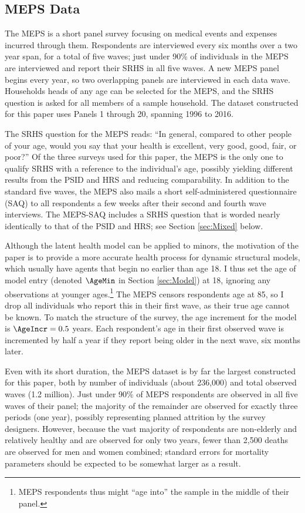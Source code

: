 \subsection{MEPS Data}\label{sec:MEPS}

The MEPS is a short panel survey focusing on medical events and expenses incurred through them.  Respondents are interviewed every six months over a two year span, for a total of five waves; just under 90\% of individuals in the MEPS are interviewed and report their SRHS in all five waves.  A new MEPS panel begins every year, so two overlapping panels are interviewed in each data wave.  Households heads of any age can be selected for the MEPS, and the SRHS question is asked for all members of a sample household.  The dataset constructed for this paper uses Panels 1 through 20, spanning 1996 to 2016.

The SRHS question for the MEPS reads: ``In general, compared to other people of your age, would you say that your health is excellent, very good, good, fair, or poor?''  Of the three surveys used for this paper, the MEPS is the only one to qualify SRHS with a reference to the individual's age, possibly yielding different results from the PSID and HRS and reducing comparability.  In addition to the standard five waves, the MEPS also mails a short self-administered questionnaire (SAQ) to all respondents a few weeks after their second and fourth wave interviews.  The MEPS-SAQ includes a SRHS question that is worded nearly identically to that of the PSID and HRS; see Section \ref{sec:Mixed} below.

Although the latent health model can be applied to minors, the motivation of the paper is to provide a more accurate health process for dynamic structural models, which usually have agents that begin no earlier than age 18.  I thus set the age of model entry (denoted $\AgeMin$ in Section \ref{sec:Model}) at 18, ignoring any observations at younger ages.\footnote{MEPS respondents thus might ``age into'' the sample in the middle of their panel.}  The MEPS censors respondents age at 85, so I drop all individuals who report this in their first wave, as their true age cannot be known.  To match the structure of the survey, the age increment for the model is $\AgeIncr=0.5$ years.  Each respondent's age in their first observed wave is incremented by half a year if they report being older in the next wave, six months later.

Even with its short duration, the MEPS dataset is by far the largest constructed for this paper, both by number of individuals (about 236,000) and total observed waves (1.2 million).  Just under 90\% of MEPS respondents are observed in all five waves of their panel; the majority of the remainder are observed for exactly three periods (one year), possibly representing planned attrition by the survey designers.  However, because the vast majority of respondents are non-elderly and relatively healthy and are observed for only two years, fewer than 2,500 deaths are observed for men and women combined; standard errors for mortality parameters should be expected to be somewhat larger as a result.